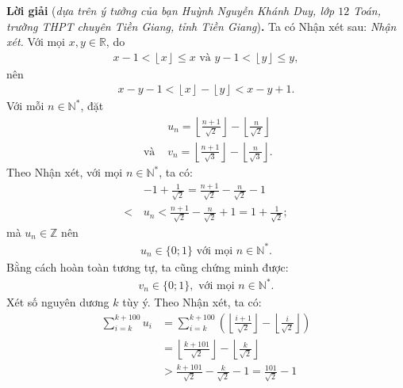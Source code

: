 \begin{multicols}{2}
	\vskip 0.05cm
	\textbf{\color{thachthuctoanhoc}Lời giải} (\textit{dựa trên ý tưởng của bạn Huỳnh Nguyễn Khánh Duy, lớp $12$ Toán, trường THPT chuyên Tiền Giang, tỉnh Tiền Giang})\textbf{\color{thachthuctoanhoc}.}
	\vskip 0.05cm
	Ta có Nhận xét sau:
	\vskip 0.05cm
	\textit{Nhận xét.} Với mọi  $x,y \in \mathbb{R}$, do 
	\begin{align*}
		x - 1 < \left\lfloor x \right\rfloor  \le x  \text{ và } y - 1 < \left\lfloor y \right\rfloor  \le y,
	\end{align*}
	nên
	\begin{align*}
		x - y - 1 < \left\lfloor x \right\rfloor  - \left\lfloor y \right\rfloor  < x - y + 1.
	\end{align*}
	Với mỗi $n \in \mathbb{N^*}$,  đặt
	\begin{align*}
		&{u_n} = \left\lfloor {\frac{{n + 1}}{{\sqrt 2 }}} \right\rfloor  - \left\lfloor {\frac{n}{{\sqrt 2 }}} \right\rfloor \\
		\text{ và } &{v_n} = \left\lfloor {\frac{{n + 1}}{{\sqrt 3 }}} \right\rfloor  - \left\lfloor {\frac{n}{{\sqrt 3 }}} \right\rfloor .
	\end{align*}  
	Theo Nhận xét, với mọi $n \in \mathbb{N^*}$, ta có:
	\begin{align*}
		&- 1 + \frac{1}{{\sqrt 2 }} = \frac{{n + 1}}{{\sqrt 2 }} - \frac{n}{{\sqrt 2 }} - 1 \\
		<\, &{u_n} < \frac{{n + 1}}{{\sqrt 2 }} - \frac{n}{{\sqrt 2 }} + 1 = 1 + \frac{1}{{\sqrt 2 }};
	\end{align*}
	mà $u_n \in \mathbb{Z}$  nên
	\begin{align*}
		u_n \in \{0;1\}  \text{ với mọi } n \in \mathbb{N^*}. \tag{$1$}
	\end{align*}
	Bằng cách hoàn toàn tương tự, ta cũng chứng minh được: 
	\begin{align*}
		v_n \in \{0;1\},  \text{ với mọi } n \in \mathbb{N^*}. \tag{$2$}
	\end{align*}
	Xét số nguyên dương $k$ tùy ý.
	\vskip 0.05cm
	Theo Nhận xét, ta có:
	\begin{align*}
		\sum\limits_{i = k}^{k + 100} {{u_i}}  &= \sum\limits_{i = k}^{k + 100} {\left( {\left\lfloor {\frac{{i + 1}}{{\sqrt 2 }}} \right\rfloor  - \left\lfloor {\frac{i}{{\sqrt 2 }}} \right\rfloor } \right)}  \\
		&= \left\lfloor {\frac{{k + 101}}{{\sqrt 2 }}} \right\rfloor  - \left\lfloor {\frac{k}{{\sqrt 2 }}} \right\rfloor  \\
		&> \frac{{k + 101}}{{\sqrt 2 }} - \frac{k}{{\sqrt 2 }} - 1 = \frac{{101}}{{\sqrt 2 }} - 1 \\

\end{align*}
\end{multicols}
